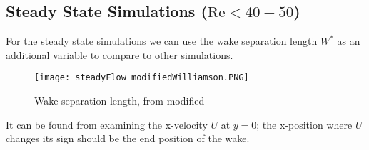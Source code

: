 	\subsection{Steady State Simulations ($\text{Re} < 40-50$)}
	For the steady state simulations we can use the wake separation length $W^*$ as an additional variable to compare to other simulations.
			\begin{figure}[htp]
				\centering
				\texttt{[image: steadyFlow\_modifiedWilliamson.PNG]}
				\caption{Wake separation length, from \cite{williamson1996vortex} modified }
				\label{fig:wakeSeparation}
			\end{figure} 
	It can be found from examining the x-velocity $U$ at $y=0$; the x-position where $U$ changes its sign should be the end position of the wake.
%
%	
